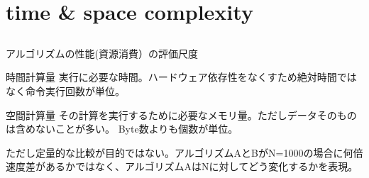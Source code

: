 \documentclass{beamer}
\subtitle{計算量}
\begin{document}
\begin{frame}[fragile]{}
\titlepage
\end{frame}

\section{time \& space complexity}		%
\subsection{}

\begin{frame}[fragile]{アルゴリズムの性能(資源消費）の評価尺度}{}
\begin{block}{時間計算量}
実行に必要な時間。ハードウェア依存性をなくすため絶対時間ではなく命令実行回数が単位。
\end{block}
\begin{block}{空間計算量}
その計算を実行するために必要なメモリ量。ただしデータそのものは含めないことが多い。
Byte数よりも個数が単位。
\end{block}

\vfill
ただし定量的な比較が目的ではない。アルゴリズムAとBがN=1000の場合に何倍速度差があるかではなく、アルゴリズムAはNに対してどう変化するかを表現。
\end{frame}
\end{document}
